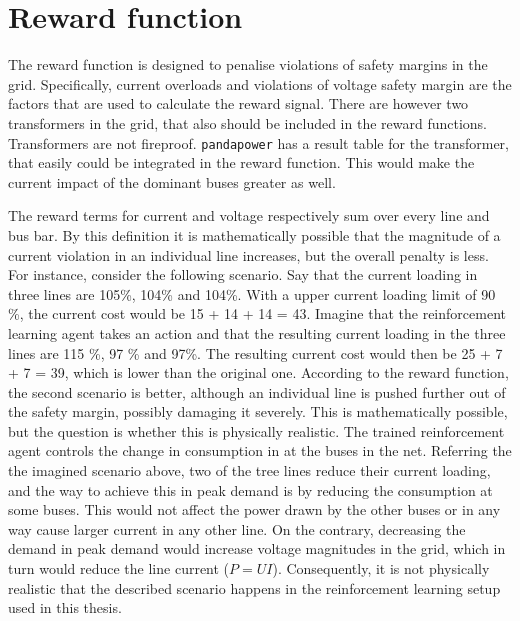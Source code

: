 \documentclass[class=book, crop=false]{standalone}
\begin{document}
\section{Reward function}
The reward function is designed to penalise violations of safety margins in the grid. Specifically, current overloads and violations of voltage safety margin are the factors that are used to calculate the reward signal. There are however two transformers in the grid, that also should be included in the reward functions. Transformers are not fireproof. \texttt{pandapower} has a result table for the transformer, that easily could be integrated in the reward function. This would make the current impact of the dominant buses greater as well. 

The reward terms for current and voltage respectively sum over every line and bus bar. By this definition it is mathematically possible that the magnitude of a current violation in an individual line increases, but the overall penalty is less. For instance, consider the following scenario. Say that the current loading in three lines are 105\%, 104\% and 104\%. With a upper current loading limit of 90 \%, the current cost would be 15 + 14 + 14 = 43. Imagine that the reinforcement learning agent takes an action and that the resulting current loading in the three lines are 115 \%, 97 \% and 97\%. The resulting current cost would then be 25 + 7 + 7 = 39, which  is lower than the original one. According to the reward function, the second scenario is better, although an individual line is pushed further out of the safety margin, possibly damaging it severely. This is mathematically possible, but the question is whether this is physically realistic. The trained reinforcement agent controls the change in consumption in at the buses in the net. Referring the the imagined scenario above, two of the tree lines reduce their current loading, and the way to achieve this in peak demand is by reducing the consumption at some buses. This would not affect the power drawn by the other buses or in any way cause larger current in any other line. On the contrary, decreasing the demand in peak demand would increase voltage magnitudes in the grid, which in turn would reduce the line current ($P = UI$). Consequently, it is not physically realistic that the described scenario happens in the reinforcement learning setup used in this thesis.
\end{document}
